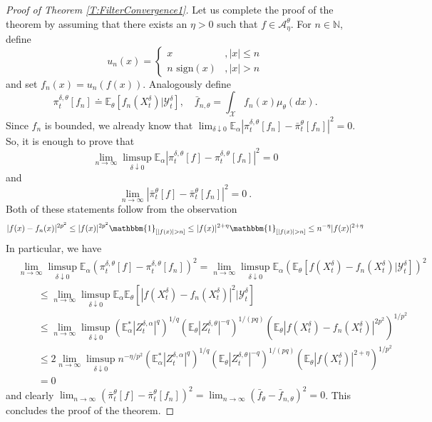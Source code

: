 \documentclass{article}
\newcommand{\indicator}[1]{\mathbbm{1}_{\left[ {#1} \right] }}
\begin{document}
\begin{proof}[Proof of Theorem \ref{T:FilterConvergence1}]
Let us complete the proof of the theorem by assuming that there exists an $\eta>0$ such that $f\in\mathcal{A}_{\eta}^\theta$. For $n\in\mathbb{N}$,   define
\[
u_{n}(x)=
\begin{cases}
x &,|x|\leq n\\
n \textrm{ sign}(x)&,|x|>n
\end{cases}
\]
and set $f_{n}(x)=u_{n}(f(x))$. Analogously define
\[
\pi^{\delta,\theta}_{t}[f_{n}]\doteq\mathbb E_{\theta}\left[f_{n}(X_t^\delta)\Big|\mathcal Y_t^\delta\right],\quad \bar{f}_{n,\theta}=\int_{\mathcal{X}}f_{n}(x)\mu_{\theta}(dx).
\]
Since $f_{n}$ is bounded, we already know that $\lim_{\delta\downarrow 0}\mathbb E_{\alpha}\left|\pi_t^{\delta,\theta}[f_{n}]-\bar \pi_t^{\theta}[f_{n}]\right|^2=0$.
So, it is enough to prove that
\[
\lim_{n\rightarrow\infty}\limsup_{\delta\downarrow 0}\mathbb E_{\alpha}\left|\pi_t^{\delta,\theta}[f]-\pi_t^{\delta,\theta}[f_{n}]\right|^2=0
\]
and
\[
\lim_{n\rightarrow\infty}\left|\bar \pi_{t}^{\theta}[f]-\bar \pi_t^{\theta}[f_{n}]\right|^2=0\ .
\]
Both of these statements follow from the observation
\[
|f(x)-f_{n}(x)|^{2p^{2}}\leq |f(x)|^{2p^{2}}\indicator{|f(x)|>n}\leq |f(x)|^{2+\eta}\indicator{|f(x)|>n}\leq n^{-\eta}|f(x)|^{2+\eta}
\]
In particular, we have
\begin{align}
&\lim_{n\rightarrow\infty}\limsup_{\delta\downarrow 0}\mathbb E_{\alpha}\left(\pi_t^{\delta,\theta}[f]-\pi_t^{\delta,\theta}[f_{n}]\right)^2=
\lim_{n\rightarrow\infty}\limsup_{\delta\downarrow 0}\mathbb E_{\alpha}\left(\mathbb{E}_{\theta}\left[f(X^{\delta}_{t})-f_{n}(X^{\delta}_{t})\Big| \mathcal{Y}^{\delta}_{t}\right]\right)^2\nonumber\\
&\qquad\leq
\lim_{n\rightarrow\infty}\limsup_{\delta\downarrow 0}\mathbb E_{\alpha}\mathbb{E}_{\theta}\left[\left|f(X^{\delta}_{t})-f_{n}(X^{\delta}_{t})\right|^2\Big| \mathcal{Y}^{\delta}_{t}\right]\nonumber\\
&\qquad\leq
\lim_{n\rightarrow\infty}\limsup_{\delta\downarrow 0}\left(\mathbb E_{\alpha}^*\left|Z_t^{\delta,\alpha}\right|^{q}\right)^{1/q}\left(\mathbb E_{\theta}\left|Z_t^{\delta,\theta}\right|^{-q}\right)^{1/(pq)}\left(\mathbb E_{\theta}\left|f(X_t^\delta)- f_n(X_t^\delta)\right|^{2p^{2}}\right)^{1/p^{2}}\nonumber\\
&\qquad\leq
2\lim_{n\rightarrow\infty}\limsup_{\delta\downarrow 0}n^{-\eta/p^{2}}\left(\mathbb E_{\alpha}^*\left|Z_t^{\delta,\alpha}\right|^{q}\right)^{1/q}\left(\mathbb E_{\theta}\left|Z_t^{\delta,\theta}\right|^{-q}\right)^{1/(pq)}\left( \mathbb  E_{\theta}\left|f(X^{\delta}_{t})\right|^{2+\eta}\right)^{1/p^{2}}\nonumber\\
&\qquad=0
\end{align}
and clearly $\lim_{n\rightarrow\infty}\left(\bar \pi_{t}^{\theta}[f]-\bar \pi_t^{\theta}[f_{n}]\right)^2=\lim_{n\rightarrow\infty}\left(\bar f_{\theta}-\bar f_{n,\theta}\right)^2=0$. This concludes the proof of the theorem.
\end{proof}
\end{document}
